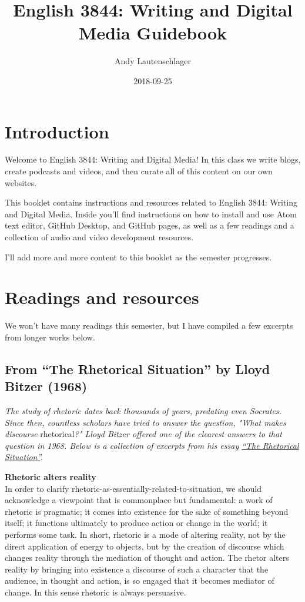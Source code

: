 \documentclass[]{book}
\title{English 3844: Writing and Digital Media Guidebook}
\author{Andy Lautenschlager}
\date{2018-09-25}
\theoremstyle{definition}
\theoremstyle{definition}
\theoremstyle{definition}
\theoremstyle{remark}
\begin{document}
\maketitle

{
\setcounter{tocdepth}{1}
\tableofcontents
}
\hypertarget{introduction}{%
\chapter{Introduction}\label{introduction}}

Welcome to English 3844: Writing and Digital Media! In this class we
write blogs, create podcasts and videos, and then curate all of this
content on our own websites.

This booklet contains instructions and resources related to English
3844: Writing and Digital Media. Inside you'll find instructions on how
to install and use Atom text editor, GitHub Desktop, and GitHub pages,
as well as a few readings and a collection of audio and video
development resources.

I'll add more and more content to this booklet as the semester
progresses.

\hypertarget{readings}{%
\chapter{Readings and resources}\label{readings}}

We won't have many readings this semester, but I have compiled a few
excerpts from longer works below.

\hypertarget{from-the-rhetorical-situation-by-lloyd-bitzer-1968}{%
\section{From ``The Rhetorical Situation'' by Lloyd Bitzer
(1968)}\label{from-the-rhetorical-situation-by-lloyd-bitzer-1968}}

\emph{The study of rhetoric dates back thousands of years, predating
even Socrates. Since then, countless scholars have tried to answer the
question, "What makes discourse} rhetorical\emph{?" Lloyd Bitzer offered
one of the clearest answers to that question in 1968. Below is a
collection of excerpts from his essay
\href{http://www.arts.uwaterloo.ca/~raha/309CWeb/Bitzer(1968).pdf}{``The
Rhetorical Situation''}.}

\textbf{Rhetoric alters reality}\\
In order to clarify rhetoric-as-essentially-related-to-situation, we
should acknowledge a viewpoint that is commonplace but fundamental: a
work of rhetoric is pragmatic; it comes into existence for the sake of
something beyond itself; it functions ultimately to produce action or
change in the world; it performs some task. In short, rhetoric is a mode
of altering reality, not by the direct application of energy to objects,
but by the creation of discourse which changes reality through the
mediation of thought and action. The rhetor alters reality by bringing
into existence a discourse of such a character that the audience, in
thought and action, is so engaged that it becomes mediator of change. In
this sense rhetoric is always persuasive.
\end{document}
